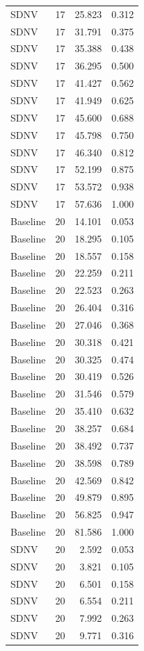 \begin{table}[t]
\begin{tabular}{lrrr}
SDNV & 17 & 25.823 & 0.312\\
SDNV & 17 & 31.791 & 0.375\\
SDNV & 17 & 35.388 & 0.438\\
SDNV & 17 & 36.295 & 0.500\\
SDNV & 17 & 41.427 & 0.562\\
SDNV & 17 & 41.949 & 0.625\\
SDNV & 17 & 45.600 & 0.688\\
SDNV & 17 & 45.798 & 0.750\\
SDNV & 17 & 46.340 & 0.812\\
SDNV & 17 & 52.199 & 0.875\\
SDNV & 17 & 53.572 & 0.938\\
SDNV & 17 & 57.636 & 1.000\\
Baseline & 20 & 14.101 & 0.053\\
Baseline & 20 & 18.295 & 0.105\\
Baseline & 20 & 18.557 & 0.158\\
Baseline & 20 & 22.259 & 0.211\\
Baseline & 20 & 22.523 & 0.263\\
Baseline & 20 & 26.404 & 0.316\\
Baseline & 20 & 27.046 & 0.368\\
Baseline & 20 & 30.318 & 0.421\\
Baseline & 20 & 30.325 & 0.474\\
Baseline & 20 & 30.419 & 0.526\\
Baseline & 20 & 31.546 & 0.579\\
Baseline & 20 & 35.410 & 0.632\\
Baseline & 20 & 38.257 & 0.684\\
Baseline & 20 & 38.492 & 0.737\\
Baseline & 20 & 38.598 & 0.789\\
Baseline & 20 & 42.569 & 0.842\\
Baseline & 20 & 49.879 & 0.895\\
Baseline & 20 & 56.825 & 0.947\\
Baseline & 20 & 81.586 & 1.000\\
SDNV & 20 & 2.592 & 0.053\\
SDNV & 20 & 3.821 & 0.105\\
SDNV & 20 & 6.501 & 0.158\\
SDNV & 20 & 6.554 & 0.211\\
SDNV & 20 & 7.992 & 0.263\\
SDNV & 20 & 9.771 & 0.316\\

\end{tabular}
\end{table}
